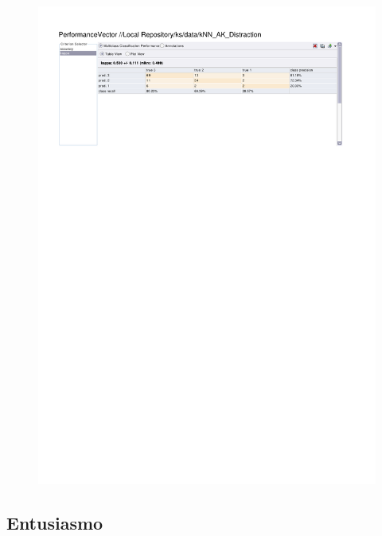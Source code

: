 \begin{figure}[htp]
  \centerline{\includegraphics[trim=0 680 0 60,clip,width=16.09cm]{results/kNN_K_Distraction.pdf}} \caption{
} \label{kNN_K_Distraction}
\end{figure}

\clearpage
\FloatBarrier
\subsection{Entusiasmo}

